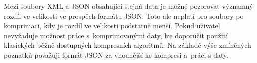 Mezi soubory XML a JSON obsahující stejná data je možné pozorovat významný rozdíl ve velikosti ve prospěch formátu JSON. Toto ale neplatí pro soubory po komprimaci, kdy je rozdíl ve velikosti podstatně menší. Pokud uživatel nevyžaduje možnost práce s~komprimovanými daty, lze doporučit použití klasických běžně dostupných kompresních algoritmů. Na základě výše zmíněných poznatků považuji formát JSON za vhodnější ke kompresi a~práci s daty.